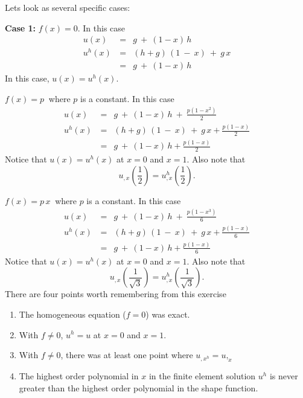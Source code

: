 \documentclass{article}
\begin{document}
Lets look as several specific cases:

\noindent
{\bf Case 1:} $f(x) = 0 $.  In this case
\begin{eqnarray}
u(x)       &=& g ~+~ (1 - x) \, h \\
u^h (x) \, &=& (h + g) \, ( 1 ~-~ x ) ~+~ g \, x \nonumber \\
           &=&  g ~+~ (1 - x) \, h 
\end{eqnarray}
In this case, $u(x) = u^h(x)$.

 $f(x) = p ~$ where $p$ is a constant.  In this case
\begin{eqnarray} 
u(x)       &=& g ~+~ (1 - x) \, h ~+~ \frac{p(1-x^2)}{2}\\ 
u^h (x) \, &=& (h + g) \, ( 1 ~-~ x ) ~+~ g \, x + \frac{p(1-x)}{2}\nonumber \\
           &=&  g ~+~ (1 - x) \, h + \frac{p(1-x)}{2}
\end{eqnarray}
Notice that $u(x) = u^h(x)$ at $x=0$ and $x=1$.   Also note that 
\begin{equation}
u_{,x}( \frac{1}{2} ) = u^h_{,x}( \frac{1}{2} ).
\end{equation}

 $f(x) = p \, x ~$ where $p$ is a constant.  In this
case
\begin{eqnarray}  
u(x)       &=& g ~+~ (1 - x) \, h ~+~ \frac{p(1-x^3)}{6}\\ 
u^h (x) \, &=& (h + g) \, ( 1 ~-~ x ) ~+~ g \, x + \frac{p(1-x)}{6}\nonumber \\
           &=&  g ~+~ (1 - x) \, h + \frac{p(1-x)}{6}
\end{eqnarray} 
Notice that $u(x) = u^h(x)$ at $x=0$ and $x=1$.   Also note that 
\begin{equation} 
u_{,x}( \frac{1}{\sqrt{3}} ) = u^h_{,x}( \frac{1}{\sqrt{3}} ).
\end{equation}
There are four points worth remembering from this exercise
\begin{enumerate}
\item The homogeneous equation ($f = 0$) was exact.

\item With $f \ne 0$, $u^h = u$ at $x=0$ and $x=1$.

\item With $f \ne 0$, there was at least one point where $u_{,x^h} = u{,_x}$

\item The highest order polynomial in $x$ in the finite element solution $u^h$ is
never greater than the highest order polynomial in the shape function.

\end{enumerate}
\end{document}
